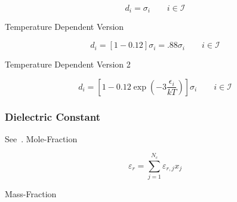 \documentclass[12pt, letterpaper]{article}
\begin{document}
\begin{equation}
    d_{i}=\sigma_{i} \qquad i\in\mathcal{I}
    \label{eq:d_ion_sigma}
\end{equation}

Temperature Dependent Version

\begin{equation}
    d_{i}=\left[1-0.12\right]\sigma_{i} = .88\sigma_{i}  \qquad i\in\mathcal{I}
    \label{eq:d_ion_sigma_const}
\end{equation}

Temperature Dependent Version 2

\begin{equation}
    d_{i}=\left[1-0.12 \exp \left(-3 \frac{\epsilon_{i}}{k T}\right)\right]\sigma_{i}  \qquad i\in\mathcal{I}
    \label{eq:d_ion_barker_henderson}
\end{equation}

\subsubsection{Dielectric Constant}

See~\cite{Ascani2021}.
Mole-Fraction

\begin{equation}
    \varepsilon_{r}=\sum_{j=1}^{N_{c}}\varepsilon_{r,j}x_{j}
    \label{eq:epsr_mix_mole}
\end{equation}

Mass-Fraction
\end{document}
